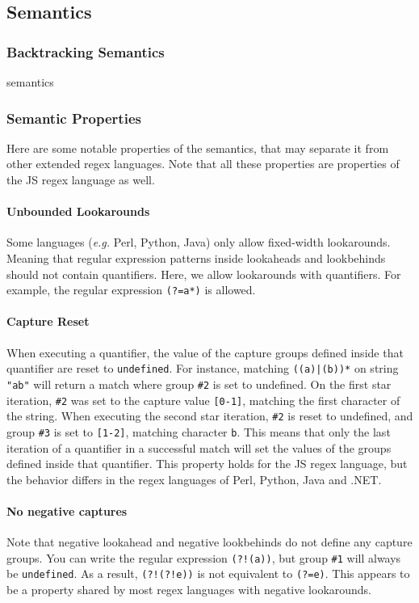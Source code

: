 \documentclass{article}
\def\regex#1{\lstinline[style=rgx]{#1}}
\def\todo#1{{\color{ACMOrange}{TODO: }}#1}
\def\undef{\texttt{undefined}}
\def\str#1{\texttt{"#1"}}
\def\group#1{\texttt{\##1}}
\begin{document}
\subsection{Semantics}
\subsubsection{Backtracking Semantics}
\todo{semantics}


\subsubsection{Semantic Properties}
Here are some notable properties of the semantics, that may separate it from other extended regex languages.
Note that all these properties are properties of the JS regex language as well.

\paragraph{Unbounded Lookarounds}
Some languages (\emph{e.g.} Perl, Python, Java) only allow fixed-width lookarounds. Meaning that regular expression patterns inside lookaheads and lookbehinds should not contain quantifiers.
Here, we allow lookarounds with quantifiers.
For example, the regular expression \regex{(?=a*)} is allowed.

\paragraph{Capture Reset}
When executing a quantifier, the value of the capture groups defined inside that quantifier are reset to \undef.
For instance, matching \regex{((a)|(b))*} on string \str{ab} will return a match where group \group{2} is set to undefined.
On the first star iteration, \group{2} was set to the capture value \texttt{[0-1]}, matching the first character of the string.
When executing the second star iteration, \group{2} is reset to undefined, and group \group{3} is set to \texttt{[1-2]}, matching character \texttt{b}.
This means that only the last iteration of a quantifier in a successful match will set the values of the groups defined inside that quantifier.
This property holds for the JS regex language, but the behavior differs in the regex languages of Perl, Python, Java and .NET.

\paragraph{No negative captures}
Note that negative lookahead and negative lookbehinds do not define any capture groups.
You can write the regular expression \regex{(?!(a))}, but group \group{1} will always be \undef.
As a result, \regex{(?!(?!e))} is not equivalent to \regex{(?=e)}.
This appears to be a property shared by most regex languages with negative lookarounds.
\end{document}
